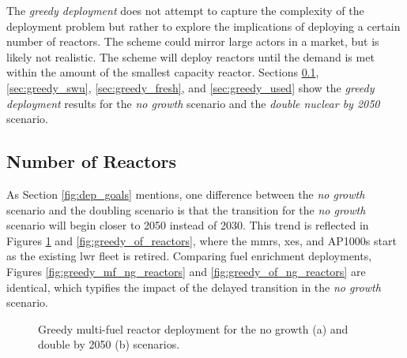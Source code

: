 The \textit{greedy deployment} does not attempt to capture the complexity of the deployment problem but rather to explore the implications of deploying a certain number of reactors. The scheme could mirror large actors in a market, but is likely not realistic. The scheme will deploy reactors until the demand is met within the amount of the smallest capacity reactor. Sections \ref{sec:greedy_reactors}, \ref{sec:greedy_swu}, \ref{sec:greedy_fresh}, and \ref{sec:greedy_used} show the \textit{greedy deployment} results for the \textit{no growth} scenario and the \textit{double nuclear by 2050} scenario.

\subsection{Number of Reactors}
\label{sec:greedy_reactors}

As Section \ref{fig:dep_goals} mentions, one difference between the \textit{no growth} scenario and the doubling scenario is that the transition for the \textit{no growth} scenario will begin closer to 2050 instead of 2030. This trend is reflected in Figures \ref{fig:greedy_mf_reactors} and \ref{fig:greedy_of_reactors}, where the \glspl{mmr}, \glspl{xe}, and AP1000s start as the existing \gls{lwr} fleet is retired. Comparing fuel enrichment deployments, Figures \ref{fig:greedy_mf_ng_reactors} and \ref{fig:greedy_of_ng_reactors} are identical, which typifies the impact of the delayed transition in the \textit{no growth} scenario.


\begin{figure}[H]
    \hfill
    \caption{Greedy multi-fuel reactor deployment for the no growth (a) and double by 2050 (b) scenarios.}
    \label{fig:greedy_mf_reactors}
\end{figure}

